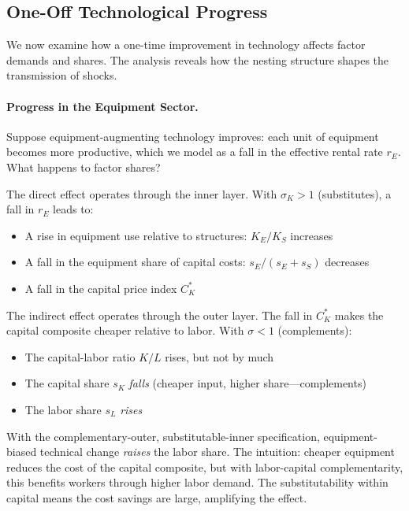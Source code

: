 \subsection{One-Off Technological Progress}
\label{subsec:tech-progress}

We now examine how a one-time improvement in technology affects factor demands and shares. The analysis reveals how the nesting structure shapes the transmission of shocks.

\paragraph{Progress in the Equipment Sector.}
Suppose equipment-augmenting technology improves: each unit of equipment becomes more productive, which we model as a fall in the effective rental rate $r_E$. What happens to factor shares?

The direct effect operates through the inner layer. With $\sigma_K > 1$ (substitutes), a fall in $r_E$ leads to:
\begin{itemize}[nosep]
\item A rise in equipment use relative to structures: $K_E/K_S$ increases
\item A fall in the equipment share of capital costs: $s_E/(s_E + s_S)$ decreases
\item A fall in the capital price index $C_K^*$
\end{itemize}

The indirect effect operates through the outer layer. The fall in $C_K^*$ makes the capital composite cheaper relative to labor. With $\sigma < 1$ (complements):
\begin{itemize}[nosep]
\item The capital-labor ratio $K/L$ rises, but not by much
\item The capital share $s_K$ \emph{falls} (cheaper input, higher share---complements)
\item The labor share $s_L$ \emph{rises}
\end{itemize}

\begin{calloutnote}
With the complementary-outer, substitutable-inner specification, equipment-biased technical change \emph{raises} the labor share. The intuition: cheaper equipment reduces the cost of the capital composite, but with labor-capital complementarity, this benefits workers through higher labor demand. The substitutability within capital means the cost savings are large, amplifying the effect.
\end{calloutnote}

